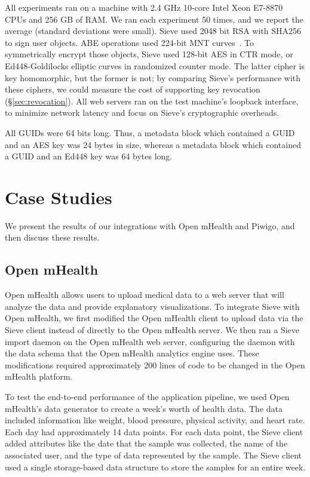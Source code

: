 All experiments ran on a machine with 2.4 GHz 10-core
Intel Xeon E7-8870 CPUs and 256 GB of RAM. We ran each
experiment 50 times, and we report the average
(standard deviations were small).
Sieve used 2048 bit RSA with SHA256 to sign
user objects. ABE operations used 224-bit MNT
curves~\cite{mnt224}. To symmetrically encrypt
those objects, Sieve used 128-bit AES in CTR
mode, or Ed448-Goldilocks elliptic curves in
randomized counter mode. The latter cipher is
key homomorphic, but the former is not; by
comparing Sieve's performance with these ciphers,
we could measure the cost of supporting key
revocation (\S\ref{sec:revocation}). All web
servers ran on the test machine's loopback
interface, to minimize network latency and
focus on Sieve's cryptographic overheads.

All GUIDs were 64 bits long. Thus, a metadata
block which contained a GUID and an AES key
was 24 bytes in size, whereas a metadata block
which contained a GUID and an Ed448 key was
64 bytes long.


\section{Case Studies}
\label{sec:integration}
We present the results of our integrations
with Open mHealth and Piwigo, and then discuss
these results.

\subsection{Open mHealth} 
Open mHealth allows
users to upload medical data to a web server
that will analyze the data and provide
explanatory visualizations. To integrate Sieve
with Open mHealth, we first modified the Open
mHealth client to upload data via the Sieve
client instead of directly to the Open mHealth
server. We then ran a Sieve import daemon on
the Open mHealth web server, configuring the
daemon with the data schema that the Open mHealth
analytics engine uses. These modifications
required approximately 200 lines of code
to be changed in the Open mHealth platform.

To test the end-to-end performance of the
application pipeline, we used Open mHealth's
data generator to create a week's worth of
health data. The data included information
like weight, blood pressure, physical activity,
and heart rate. Each day had approximately
14 data points. For each data point, the
Sieve client added attributes like the
date that the sample was collected, the
name of the associated user, and the type
of data represented by the sample. The Sieve
client used a single storage-based data 
structure to store the samples for an entire week.

